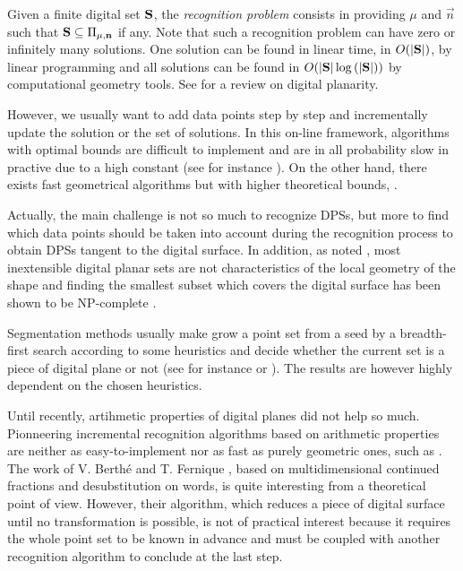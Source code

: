 Given a finite digital set $\mathbf{S}$, the \emph{recognition problem} consists in providing
$\mu$ and $\vec{n}$ such that $\mathbf{S} \subseteq \Pi_{\mu,\mathbf{n}}$ if any.
Note that such a recognition problem can have zero or infinitely many solutions.
One solution can be found in linear time, \ie in $O(|\mathbf{S}|)$, by linear programming
and all solutions can be found in $O(|\mathbf{S}|\log{(|\ensuremath{\mathbf{S}}|)})$ by computational geometry tools.
See \cite{Brimkov2007} for a review on digital planarity.

However, we usually want to add data points step by step and incrementally update the solution
or the set of solutions. In this on-line framework, algorithms with optimal bounds are difficult
to implement and are in all probability slow in practive due to a high constant (see for instance
\cite{Buzer2003}).
On the other hand, there exists fast geometrical algorithms but with higher theoretical bounds,
\eg \cite{Gerard2005, Charrier2008, Veelaert2012}.


Actually, the main challenge is not so much to recognize DPSs, but more to find which data points
should be taken into account during the recognition process to obtain DPSs tangent to the digital
surface. In addition, as noted \cite{Charrier2011}, most inextensible digital planar sets are not
characteristics of the local geometry of the shape and finding the smallest subset which covers
the digital surface has been shown to be NP-complete \cite{Sivignon2009}.

Segmentation methods usually make grow a point set from a seed by a breadth-first search according
to some heuristics and decide whether the current set is a piece of digital plane or not
(see for instance \cite{Klette2001} or \cite{Sivignon2004}). 
The results are however highly dependent on the chosen heuristics.   

Until recently, artihmetic properties of digital planes did not help so much.
Pionneering incremental recognition algorithms based on arithmetic properties
\cite{Debled1994,Mesmoudi2002} are neither as easy-to-implement nor as fast as
purely geometric ones, such as \cite{Gerard2005}.  
The work of V. Berth\'{e} and T. Fernique \cite{Fernique2009,Berthe2011}, 
based on multidimensional continued fractions and desubstitution on words,
is quite interesting from a theoretical point of view. However, their algorithm,
which reduces a piece of digital surface until no transformation is possible,
is not of practical interest because it requires the whole point set to be known
in advance and must be coupled with another recognition algorithm to conclude
at the last step.  

